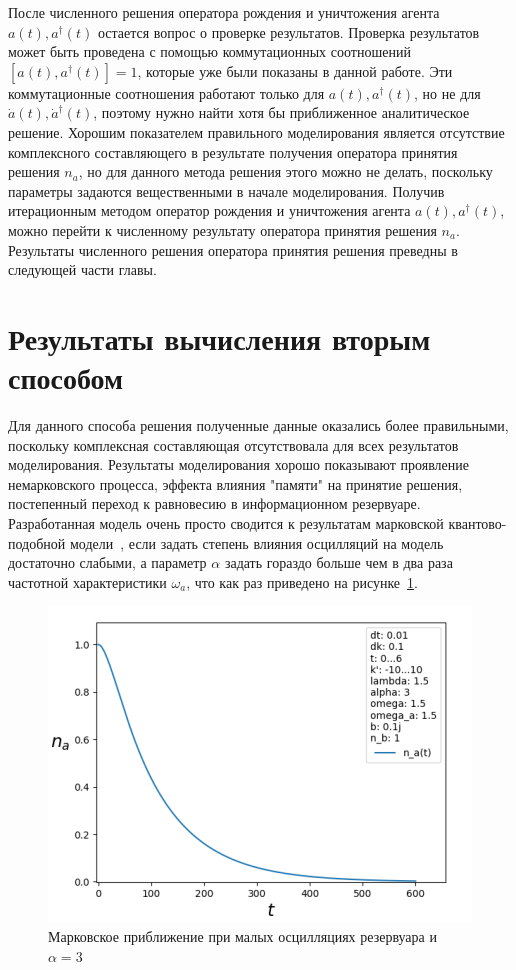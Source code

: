 После численного решения оператора рождения и уничтожения агента $a(t), a^{\dagger}(t)$ остается
вопрос о проверке результатов.
Проверка результатов может быть проведена с помощью коммутационных соотношений $[a(t), a^{\dagger}(t)] = 1$,
которые уже были показаны в данной работе.
Эти коммутационные соотношения работают только для $a(t), a^{\dagger}(t)$, но не для
$\dot{a}(t), \dot{a}^{\dagger}(t)$, поэтому нужно найти хотя бы приближенное аналитическое решение.
Хорошим показателем правильного моделирования является отсутствие комплексного составляющего в результате
получения оператора принятия решения $n_{a}$, но для данного метода решения этого можно не делать,
поскольку параметры задаются вещественными в начале моделирования.
Получив итерационным методом оператор рождения и уничтожения агента $a(t), a^{\dagger}(t)$, можно
перейти к численному результату оператора принятия решения $n_{a}$.
Результаты численного решения оператора принятия решения преведны в следующей части главы.

\section{Результаты вычисления вторым способом}

Для данного способа решения полученные данные оказались более правильными, поскольку комплексная составляющая
отсутствовала для всех результатов моделирования.
Результаты моделирования хорошо показывают проявление немарковского процесса, эффекта влияния "памяти"
на принятие решения, постепенный переход к равновесию в информационном резервуаре.
Разработанная модель очень просто сводится к результатам марковской квантово-подобной модели~\citep{bagarello2018quantum},
если задать степень влияния осцилляций на модель достаточно слабыми, а параметр $\alpha$ задать гораздо
больше чем в два раза частотной характеристики $\omega_{a}$, что как раз приведено на рисунке~\ref{fig:sr_mark}.
\begin{figure}[h!]
    \centering
    \captionsetup{justification=centering}
    \includegraphics[width=0.7\linewidth]{pictures/result_second_1.png}
    \caption{Марковское приближение при малых осцилляциях резервуара и $\alpha = 3$}
    \label{fig:sr_mark}
\end{figure}

